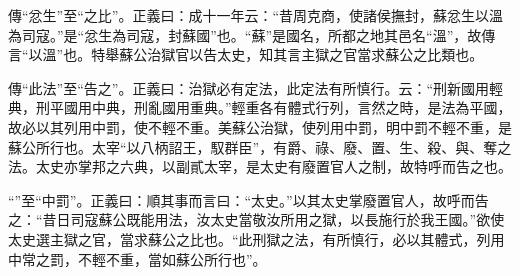 {\noindent\zhuan{}\fzbyks 傳“忿生”至“之比”。正義曰：成十一年云：“昔周克商，使諸侯撫封，蘇忿生以溫為司寇。”是“忿生為司寇，封蘇國”也。“蘇”是國名，所都之地其邑名“溫”，故傳言“以溫”也。特舉蘇公治獄官以告太史，知其言主獄之官當求蘇公之比類也。 \par}

{\noindent\zhuan{}\fzbyks 傳“此法”至“告之”。正義曰：治獄必有定法，此定法有所慎行。云：“刑新國用輕典，刑平國用中典，刑亂國用重典。”輕重各有體式行列，言然之時，是法為平國，故必以其列用中罰，使不輕不重。美蘇公治獄，使列用中罰，明中罰不輕不重，是蘇公所行也。太宰“以八柄詔王，馭群臣”，有爵、祿、廢、置、生、殺、與、奪之法。太史亦掌邦之六典，以副貳太宰，是太史有廢置官人之制，故特呼而告之也。 \par}

{\noindent\shu{}\fzkt “”至“中罰”。正義曰：順其事而言曰：“太史。”以其太史掌廢置官人，故呼而告之：“昔日司寇蘇公既能用法，汝太史當敬汝所用之獄，以長施行於我王國。”欲使太史選主獄之官，當求蘇公之比也。“此刑獄之法，有所慎行，必以其體式，列用中常之罰，不輕不重，當如蘇公所行也”。 \par}

